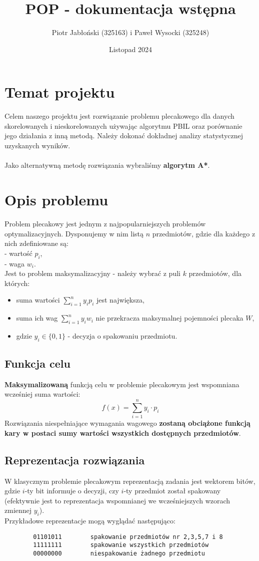 \documentclass[11pt]{article}
\author{Piotr Jabłoński (325163) i Paweł Wysocki (325248)}
\date{Listopad 2024}
\title{POP - dokumentacja wstępna}
\begin{document}
\maketitle
\tableofcontents

\pagebreak
\section{Temat projektu}
\label{sec:org66d662c}
Celem naszego projektu jest rozwiązanie problemu plecakowego dla danych skorelowanych i nieskorelowanych używając algorytmu PBIL oraz porównanie jego działania z inną metodą. Należy dokonać dokładnej analizy statystycznej uzyskanych wyników. \\\\
Jako alternatywną metodę rozwiązania wybraliśmy \textbf{algorytm A*}.
\section{Opis problemu}
\label{sec:org4d991fb}
Problem plecakowy jest jednym z najpopularniejszych problemów optymalizacyjnych. 
Dysponujemy w nim listą $n$ przedmiotów, gdzie dla każdego z nich zdefiniowane są:\\
- wartość $p_i$,\\
- waga $w_i$.\\
Jest to problem maksymalizacyjny - należy wybrać z puli $k$ przedmiotów, dla których:
\begin{itemize}
    \item suma wartości $\sum_{i=1}^n y_i p_i$ jest największa,
    \item suma ich wag $\sum_{i=1}^n y_i w_i$ nie przekracza maksymalnej pojemności plecaka $W$,
    \item gdzie $y_i \in \{0,1\}$ - decyzja o spakowaniu przedmiotu.
\end{itemize}

\subsection{Funkcja celu}
\label{sec:orgfed3d26}
\textbf{Maksymalizowaną} funkcją celu w problemie plecakowym jest wspomniana wcześniej suma wartości:
$$
f(x) = \sum_{i=1}^n y_i \cdot p_i
$$
Rozwiązania niespełniające wymagania wagowego \textbf{zostaną obciążone funkcją kary w postaci sumy wartości wszystkich dostępnych przedmiotów}.
\subsection{Reprezentacja rozwiązania}
\label{sec:org7c490b7}
W klasycznym problemie plecakowym reprezentacją zadania jest wektorem bitów, gdzie $i$-ty bit informuje o decyzji, czy $i$-ty przedmiot został spakowany (efektywnie jest to reprezentacja wspomnianej we wcześniejszych wzorach zmiennej $y_i$). \\
Przykładowe reprezentacje mogą wyglądać następująco:
\begin{verbatim}
        01101011        spakowanie przedmiotów nr 2,3,5,7 i 8
        11111111        spakowanie wszystkich przedmiotów
        00000000        niespakowanie żadnego przedmiotu
\end{verbatim}
\end{document}
